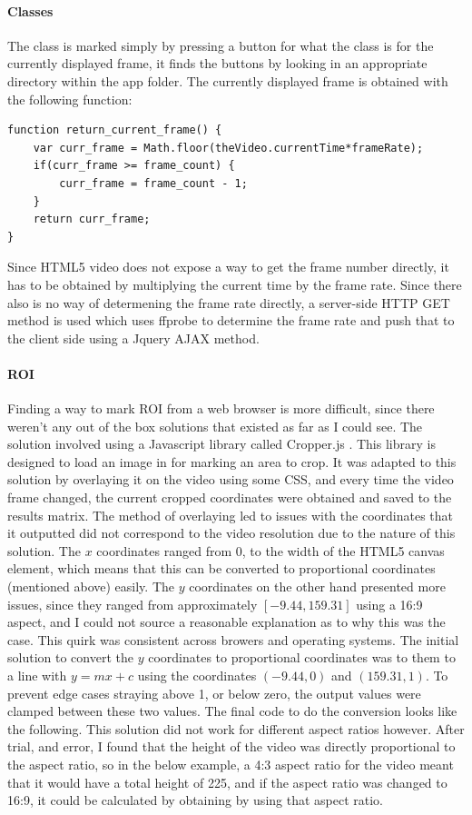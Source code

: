             \paragraph{Classes}
            The class is marked simply by pressing a button for what the class is for the currently displayed frame, it finds the buttons by looking in an appropriate directory within the app folder. The currently displayed frame is obtained with the following function:
                \begin{lstlisting}[style=JSStyle]
function return_current_frame() {
    var curr_frame = Math.floor(theVideo.currentTime*frameRate);
    if(curr_frame >= frame_count) {
        curr_frame = frame_count - 1;
    }
    return curr_frame;
}\end{lstlisting} 
            Since HTML5 video does not expose a way to get the frame number directly, it has to be obtained by multiplying the current time by the frame rate. Since there also is no way of determening the frame rate directly, a server-side HTTP GET method is used which uses ffprobe to determine the frame rate and push that to the client side using a Jquery AJAX method.

            \paragraph{ROI}
            Finding a way to mark ROI from a web browser is more difficult, since there weren't any out of the box solutions that existed as far as I could see. The solution involved using a Javascript library called Cropper.js \cite{cropperjs}. This library is designed to load an image in for marking an area to crop. It was adapted to this solution by overlaying it on the video using some CSS, and every time the video frame changed, the current cropped coordinates were obtained and saved to the results matrix. The method of overlaying led to issues with the coordinates that it outputted did not correspond to the video resolution due to the nature of this solution. The $x$ coordinates ranged from 0, to the width of the HTML5 canvas element, which means that this can be converted to proportional coordinates (mentioned above) easily. The $y$ coordinates on the other hand presented more issues, since they ranged from approximately $[-9.44, 159.31]$ using a 16:9 aspect, and I could not source a reasonable explanation as to why this was the case. This quirk was consistent across browers and operating systems. The initial solution to convert the $y$ coordinates to proportional coordinates was to them to a line with $y=mx+c$ using the coordinates $(-9.44,0)$ and $(159.31,1)$. To prevent edge cases straying above 1, or below zero, the output values were clamped between these two values. The final code to do the conversion looks like the following. This solution did not work for different aspect ratios however. After trial, and error, I found that the height of the video was directly proportional to the aspect ratio, so in the below example, a 4:3 aspect ratio for the video meant that it would have a total height of 225, and if the aspect ratio was changed to 16:9, it could be calculated by obtaining by using that aspect ratio.

